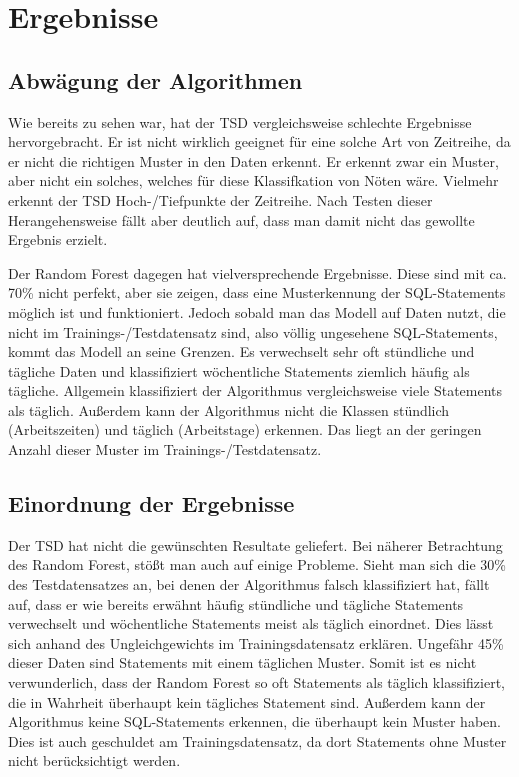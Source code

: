 \chapter{Ergebnisse}

\section{Abwägung der Algorithmen}

Wie bereits zu sehen war, hat der TSD vergleichsweise schlechte Ergebnisse hervorgebracht. Er ist nicht wirklich geeignet für eine solche Art von Zeitreihe, da er nicht die richtigen Muster in den Daten erkennt. Er erkennt zwar ein Muster, aber nicht ein solches, welches für diese Klassifkation von Nöten wäre. Vielmehr erkennt der TSD Hoch-/Tiefpunkte der Zeitreihe. Nach Testen dieser Herangehensweise fällt aber deutlich auf, dass man damit nicht das gewollte Ergebnis erzielt. 

Der Random Forest dagegen hat vielversprechende Ergebnisse. Diese sind mit ca. 70\% nicht perfekt, aber sie zeigen, dass eine Musterkennung der SQL-Statements möglich ist und funktioniert. Jedoch sobald man das Modell auf Daten nutzt, die nicht im Trainings-/Testdatensatz sind, also völlig ungesehene SQL-Statements, kommt das Modell an seine Grenzen. Es verwechselt sehr oft stündliche und tägliche Daten und klassifiziert wöchentliche Statements ziemlich häufig als tägliche. Allgemein klassifiziert der Algorithmus vergleichsweise viele Statements als täglich. Außerdem kann der Algorithmus nicht die Klassen stündlich (Arbeitszeiten) und täglich (Arbeitstage) erkennen. Das liegt an der geringen Anzahl dieser Muster im Trainings-/Testdatensatz.

\section{Einordnung der Ergebnisse}

Der TSD hat nicht die gewünschten Resultate geliefert. Bei näherer Betrachtung des Random Forest, stößt man auch auf einige Probleme. Sieht man sich die 30\% des Testdatensatzes an, bei denen der Algorithmus falsch klassifiziert hat, fällt auf, dass er wie bereits erwähnt häufig stündliche und tägliche Statements verwechselt und wöchentliche Statements meist als täglich einordnet. Dies lässt sich anhand des Ungleichgewichts im Trainingsdatensatz erklären. Ungefähr 45\% dieser Daten sind Statements mit einem täglichen Muster. Somit ist es nicht verwunderlich, dass der Random Forest so oft Statements als täglich klassifiziert, die in Wahrheit überhaupt kein tägliches Statement sind. Außerdem kann der Algorithmus keine SQL-Statements erkennen, die überhaupt kein Muster haben. Dies ist auch geschuldet am Trainingsdatensatz, da dort Statements ohne Muster nicht berücksichtigt werden.


